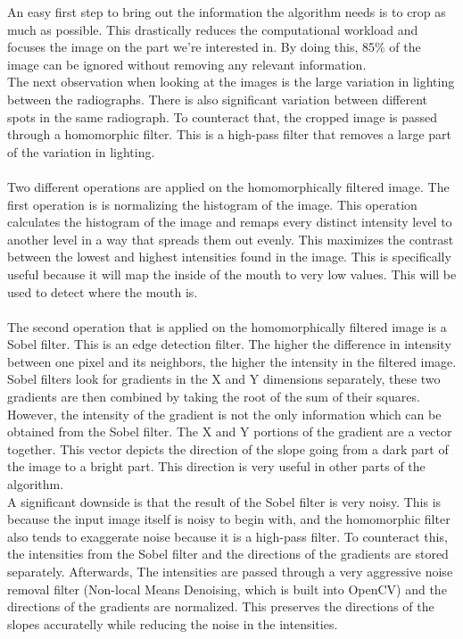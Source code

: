 \documentclass[a4paper,10pt]{article}
\begin{document}
An easy first step to bring out the information the algorithm needs is to crop as much as possible. This drastically reduces the computational workload and focuses the image on the part we're interested in. By doing this, 85\% of the image can be ignored without removing any relevant information.
\\
The next observation when looking at the images is the large variation in lighting between the radiographs. There is also significant variation between different spots in the same radiograph. To counteract that, the cropped image is passed through a homomorphic filter. This is a high-pass filter that removes a large part of the variation in lighting.
\\\\
Two different operations are applied on the homomorphically filtered image. The first operation is is normalizing the histogram of the image. This operation calculates the histogram of the image and remaps every distinct intensity level to another level in a way that spreads them out evenly. This maximizes the contrast between the lowest and highest intensities found in the image. This is specifically useful because it will map the inside of the mouth to very low values. This will be used to detect where the mouth is.\\\\
The second operation that is applied on the homomorphically filtered image is a Sobel filter. This is an edge detection filter. The higher the difference in intensity between one pixel and its neighbors, the higher the intensity in the filtered image. Sobel filters look for gradients in the X and Y dimensions separately, these two gradients are then combined by taking the root of the sum of their squares. However, the intensity of the gradient is not the only information which can be obtained from the Sobel filter. The X and Y portions of the gradient are a vector together. This vector depicts the direction of the slope going from a dark part of the image to a bright part. This direction is very useful in other parts of the algorithm. \\
A significant downside is that the result of the Sobel filter is very noisy. This is because the input image itself is noisy to begin with, and the homomorphic filter also tends to exaggerate noise because it is a high-pass filter. To counteract this, the intensities from the Sobel filter and the directions of the gradients are stored separately. Afterwards, The intensities are passed through a very aggressive noise removal filter (Non-local Means Denoising, which is built into OpenCV) and the directions of the gradients are normalized. This preserves the directions of the slopes accuratelly while reducing the noise in the intensities.
\end{document}
